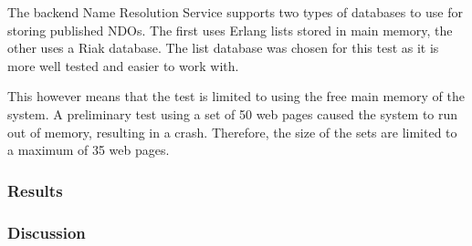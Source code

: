 The backend Name Resolution Service supports two types of databases to use for storing published NDOs. The first uses Erlang lists stored in main memory, the other uses a Riak database. The list database was chosen for this test as it is more well tested and easier to work with.

This however means that the test is limited to using the free main memory of the system. A preliminary test using a set of 50 web pages caused the system to run out of memory, resulting in a crash. Therefore, the size of the sets are limited to a maximum of 35 web pages.

\subsubsection{Results}



\subsubsection{Discussion}

